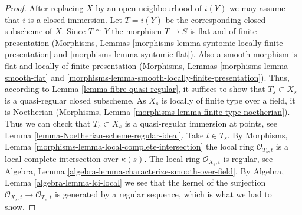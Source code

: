 \documentclass[10pt,a4paper]{amsart}
\theoremstyle{plain}
\theoremstyle{definition}
\theoremstyle{remark}
\numberwithin{equation}{subsection}
\begin{document}
\begin{proof}
After replacing $X$ by an open neighbourhood of $i(Y)$
we may assume that $i$ is a closed immersion.
Let $T = i(Y)$ be the corresponding closed subscheme of $X$. Since
$T \cong Y$ the morphism $T \to S$ is flat and of finite presentation
(Morphisms, Lemmas
\ref{morphisms-lemma-syntomic-locally-finite-presentation} and
\ref{morphisms-lemma-syntomic-flat}).
Also a smooth morphism is flat and locally of finite presentation
(Morphisms, Lemmas
\ref{morphisms-lemma-smooth-flat} and
\ref{morphisms-lemma-smooth-locally-finite-presentation}).
Thus, according to
Lemma \ref{lemma-fibre-quasi-regular},
it suffices to show that $T_s \subset X_s$ is a quasi-regular closed
subscheme. As $X_s$ is locally of finite type over a field, it is Noetherian
(Morphisms, Lemma \ref{morphisms-lemma-finite-type-noetherian}).
Thus we can check that $T_s \subset X_s$ is a quasi-regular immersion
at points, see
Lemma \ref{lemma-Noetherian-scheme-regular-ideal}.
Take $t \in T_s$. By
Morphisms, Lemma \ref{morphisms-lemma-local-complete-intersection}
the local ring $\mathcal{O}_{T_s, t}$ is a local complete intersection
over $\kappa(s)$.
The local ring $\mathcal{O}_{X_s, t}$ is regular, see
Algebra, Lemma \ref{algebra-lemma-characterize-smooth-over-field}.
By
Algebra, Lemma \ref{algebra-lemma-lci-local}
we see that the kernel of the surjection
$\mathcal{O}_{X_s, t} \to \mathcal{O}_{T_s, t}$ is generated by a regular
sequence, which is what we had to show.
\end{proof}
\end{document}
